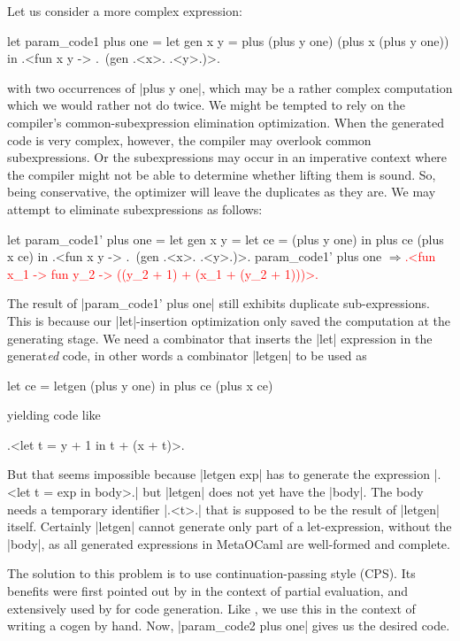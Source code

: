 \documentclass{elsart}
\newcommand{\evalresult}[1]{\ensuremath{\Longrightarrow}\textcolor{red}{#1}}
\begin{document}
Let us consider a more complex expression:
\begin{code}
let param_code1 plus one =
  let gen x y = plus (plus y one) (plus x (plus y one)) in
  .<fun x y -> .~(gen .<x>. .<y>.)>.
\end{code}
with two occurrences of |plus y one|,
which may be a rather complex computation which we would rather not do
twice. We might be tempted to rely on the compiler's
common-subexpression elimination optimization. When the generated code is
very complex, however, the compiler may overlook common subexpressions.  Or the
subexpressions may occur in an imperative context where the compiler
might not be able to determine whether lifting them is sound. So, being
conservative, the optimizer will leave the duplicates as they are. 
We may attempt to eliminate subexpressions as follows: 
\begin{code}[commandchars=\\\{\}]
let param_code1' plus one =
  let gen x y = let ce = (plus y one) in  plus ce (plus x ce) in
  .<fun x y -> .~(gen .<x>. .<y>.)>.
param_code1' plus one
\evalresult{.<fun x_1 -> fun y_2 -> ((y_2 + 1) + (x_1 + (y_2 + 1)))>.}
\end{code}
The result of |param_code1' plus one| still exhibits duplicate
sub-expressions.  This is because our |let|-insertion optimization only saved
the computation at the generating stage.  We need a combinator that
inserts the |let| expression in the generat\emph{ed} code, in other words a
combinator |letgen| to be used as
\begin{code}
let ce = letgen (plus y one) in plus ce (plus x ce)
\end{code}
yielding code like 
\begin{code}
.<let t = y + 1 in t + (x + t)>.
\end{code}
But that seems impossible because |letgen exp| has to generate
the expression |.<let t = exp in body>.| but |letgen| does not yet
have the |body|. The body needs a temporary identifier |.<t>.|
that is supposed to be the result of |letgen| itself.  Certainly
|letgen| cannot generate only part of a let-expression, without the
|body|, as all generated expressions in MetaOCaml are well-formed and
complete.

The solution to this problem is to use continuation-passing style (CPS). Its
benefits were first pointed out by \cite{Bondorf:92} in the context of partial
evaluation, and extensively used by \cite{SwadiMonadic06,KiselyovTaha} for
code generation. Like \cite{conf/pepm/BondorfD94}, we use this in the 
context of writing a cogen by hand.  Now, |param_code2 plus one| gives us the
desired code.
\end{document}
